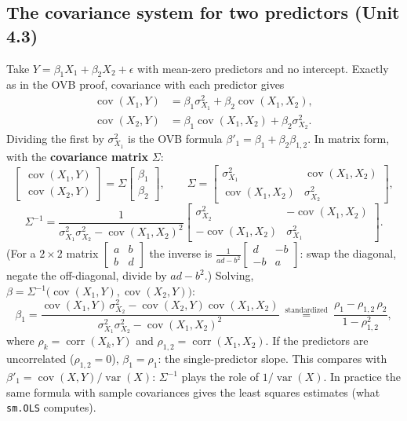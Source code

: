 \documentclass[11pt]{article}
\newcommand{\Var}{\operatorname{var}}
\newcommand{\Cov}{\operatorname{cov}}
\newcommand{\corr}{\operatorname{corr}}
\newcommand{\py}[1]{\texttt{#1}}
\begin{document}
\subsection{The covariance system for two predictors (Unit 4.3)}
Take $Y=\beta_1X_1+\beta_2X_2+\epsilon$ with mean-zero predictors and no intercept. Exactly as in the OVB proof, covariance with each predictor gives
\begin{align*}
\Cov(X_1,Y)&=\beta_1\sigma_{X_1}^2+\beta_2\Cov(X_1,X_2),\\
\Cov(X_2,Y)&=\beta_1\Cov(X_1,X_2)+\beta_2\sigma_{X_2}^2.
\end{align*}
Dividing the first by $\sigma_{X_1}^2$ is the OVB formula $\beta'_1=\beta_1+\beta_2\beta_{1,2}$. In matrix form, with the \textbf{covariance matrix} $\Sigma$:
\[
\begin{bmatrix}\Cov(X_1,Y)\\\Cov(X_2,Y)\end{bmatrix}=\Sigma\begin{bmatrix}\beta_1\\\beta_2\end{bmatrix},\qquad
\Sigma=\begin{bmatrix}\sigma_{X_1}^2&\Cov(X_1,X_2)\\\Cov(X_1,X_2)&\sigma_{X_2}^2\end{bmatrix},
\]
\[
\Sigma^{-1}=\frac{1}{\sigma_{X_1}^2\sigma_{X_2}^2-\Cov(X_1,X_2)^2}\begin{bmatrix}\sigma_{X_2}^2&-\Cov(X_1,X_2)\\-\Cov(X_1,X_2)&\sigma_{X_1}^2\end{bmatrix}.
\]
(For a $2\times2$ matrix $\begin{bmatrix}a&b\\b&d\end{bmatrix}$ the inverse is $\frac{1}{ad-b^2}\begin{bmatrix}d&-b\\-b&a\end{bmatrix}$: swap the diagonal, negate
the off-diagonal, divide by $ad-b^2$.) Solving, $\beta=\Sigma^{-1}\big(\Cov(X_1,Y),\Cov(X_2,Y)\big)$:
\[
\beta_1=\frac{\Cov(X_1,Y)\,\sigma_{X_2}^2-\Cov(X_2,Y)\Cov(X_1,X_2)}{\sigma_{X_1}^2\sigma_{X_2}^2-\Cov(X_1,X_2)^2}
\ \overset{\text{standardized}}{=}\ \frac{\rho_1-\rho_{1,2}\,\rho_2}{1-\rho_{1,2}^2},
\]
where $\rho_k=\corr(X_k,Y)$ and $\rho_{1,2}=\corr(X_1,X_2)$. If the predictors are uncorrelated ($\rho_{1,2}=0$), $\beta_1=\rho_1$: the
single-predictor slope. This compares with $\beta'_1=\Cov(X,Y)/\Var(X)$: $\Sigma^{-1}$ plays the role of $1/\Var(X)$. In practice the same
formula with sample covariances gives the least squares estimates (what \py{sm.OLS} computes).
\end{document}
